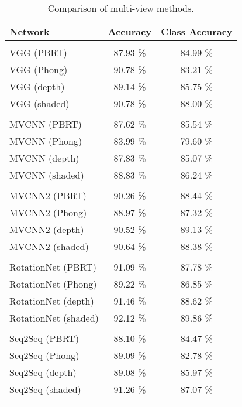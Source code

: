\begin{table}[]
	\centering
	\begin{tabular}{lcc}
		\hline
		\textbf{Network}     & \textbf{Accuracy} & \textbf{Class Accuracy } \\ \hline
		                     &                   &                         \\
		VGG (PBRT)           &     87.93 \%      &        84.99 \%         \\
		VGG (Phong)          &     90.78 \%      &        83.21 \%         \\
		VGG (depth)          &     89.14 \%      &        85.75 \%         \\
		VGG (shaded)         &     90.78 \%      &        88.00 \%         \\
		                     &                   &                         \\
		MVCNN (PBRT)         &     87.62 \%      &        85.54 \%         \\
		MVCNN (Phong)        &     83.99 \%      &        79.60 \%         \\
		MVCNN (depth)        &     87.83 \%      &        85.07 \%         \\
		MVCNN (shaded)       &     88.83 \%      &        86.24 \%         \\
		                     &                   &                         \\
		MVCNN2 (PBRT)        &     90.26 \%      &        88.44 \%         \\
		MVCNN2 (Phong)       &     88.97 \%      &        87.32 \%         \\
		MVCNN2 (depth)       &     90.52 \%      &        89.13 \%         \\
		MVCNN2 (shaded)      &     90.64 \%      &        88.38 \%         \\
		                     &                   &                         \\
		RotationNet (PBRT)   &     91.09 \%      &        87.78 \%         \\
		RotationNet (Phong)  &     89.22 \%      &        86.85 \%         \\
		RotationNet (depth)  &     91.46 \%      &        88.62 \%         \\
		RotationNet (shaded) &     92.12 \%      &        89.86 \%         \\
		                     &                   &                         \\
		Seq2Seq  (PBRT)      &     88.10 \%      &        84.47 \%         \\
		Seq2Seq  (Phong)     &     89.09 \%      &        82.78 \%         \\
		Seq2Seq  (depth)     &     89.08 \%      &        85.97 \%         \\
		Seq2Seq  (shaded)    &     91.26 \%      &        87.07 \%         \\
		                     &                   &                         \\ \hline
	\end{tabular}
\caption{Comparison of multi-view methods.}
\label{Table:mv}
\end{table}
